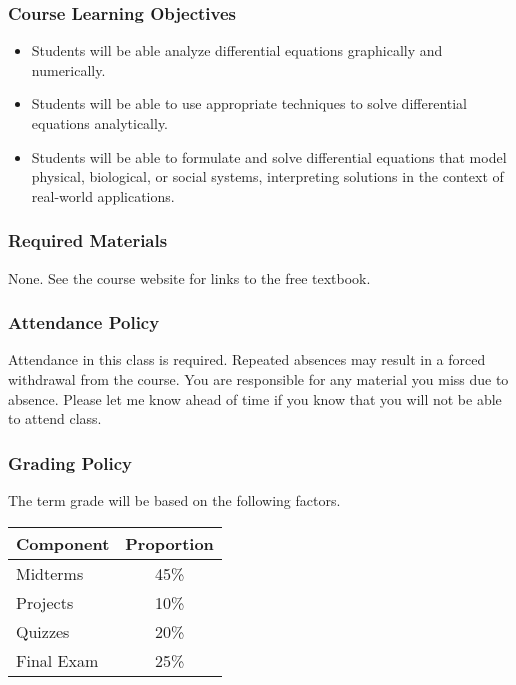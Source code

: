\documentclass[10pt]{article}
\begin{document}
\subsubsection*{Course Learning Objectives}

\begin{itemize}

\item Students will be able analyze differential equations graphically and numerically.

\item Students will be able to use appropriate techniques to solve differential equations analytically. 

\item Students will be able to formulate and solve differential equations that model physical, biological, or social systems, interpreting solutions in the context of real-world applications.

\end{itemize}

\subsubsection*{Required Materials}

None. See the course website for links to the free textbook.

%
\subsubsection*{Attendance Policy}

Attendance in this class is required. Repeated absences may result in a forced withdrawal from the course. You are responsible for any material you miss due to absence. Please let me know ahead of time if you know that you will not be able to attend class.

\subsubsection*{Grading Policy}

The term grade will be based on the following factors.

\begin{center}
\begin{tabular}{|l|c|}
\hline
Component      & Proportion \\ \hline
Midterms  & 45\% \\
Projects  & 10\% \\
Quizzes  & 20\% \\
Final Exam  & 25\% \\ \hline
\end{tabular}
\end{center}
\end{document}
